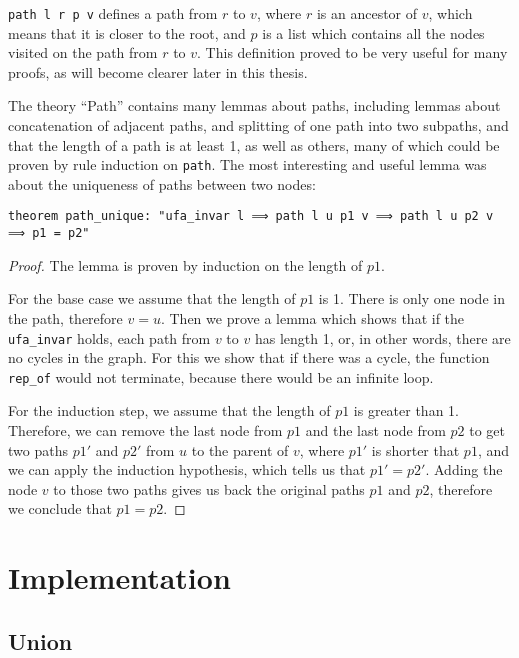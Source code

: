 \lstinline{path l r p v} defines a path from $r$ to $v$, where $r$ is an ancestor of $v$, which means that it is closer to the root, and $p$ is a list which contains all the nodes visited on the path from $r$ to $v$. This definition proved to be very useful for many proofs, as will become clearer later in this thesis.

The theory ``Path'' contains many lemmas about paths, including lemmas about concatenation of adjacent paths, and splitting of one path into two subpaths, and that the length of a path is at least 1, as well as others, many of which could be proven by rule induction on \lstinline{path}. The most interesting and useful lemma was about the uniqueness of paths between two nodes:

\begin{lstlisting}
theorem path_unique: "ufa_invar l ⟹ path l u p1 v ⟹ path l u p2 v ⟹ p1 = p2"
\end{lstlisting}

\begin{proof}
The lemma is proven by induction on the length of $p1$.

For the base case we assume that the length of $p1$ is 1. There is only one node in the path, therefore $v = u$. Then we prove a lemma which shows that if the \lstinline{ufa_invar} holds, each path from $v$ to $v$ has length 1, or, in other words, there are no cycles in the graph. For this we show that if there was a cycle, the function \lstinline{rep_of} would not terminate, because there would be an infinite loop.

For the induction step, we assume that the length of $p1$ is greater than 1. Therefore, we can remove the last node from $p1$ and the last node from $p2$ to get two paths $p1'$ and $p2'$ from $u$ to the parent of $v$, where $p1'$ is shorter that $p1$, and we can apply the induction hypothesis, which tells us that $p1' = p2'$. Adding the node $v$ to those two paths gives us back the original paths $p1$ and $p2$, therefore we conclude that $p1 = p2$.
\end{proof}

\section{Implementation}

\subsection{Union}

